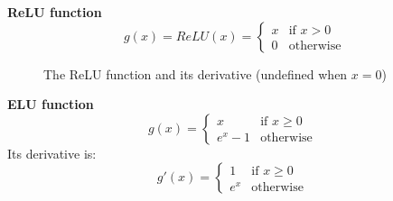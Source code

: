  \noindent \textbf{ReLU function}\\
 \begin{equation}
 g(x) = ReLU(x) = 
 \begin{cases}
    x & \text{if } x> 0\\
    0              & \text{otherwise}
\end{cases}
 \end{equation}
 
 \begin{figure}[h!]
  \begin{center}
    \caption{The ReLU function and its derivative (undefined when $x=0$)}
  \end{center}
\end{figure} 
 
 
 
 
 \noindent \textbf{ELU function}\\
 \begin{equation}
 g(x) = 
 \begin{cases}
    x & \text{if } x\geq 0\\
    e^{x}-1 & \text{otherwise }
\end{cases}
 \end{equation}
 Its derivative is:
 \begin{equation}
g'(x) = 
 \begin{cases}
    1 & \text{if } x\geq 0\\
    e^{x} & \text{otherwise }
\end{cases}
 \end{equation}
 
 

